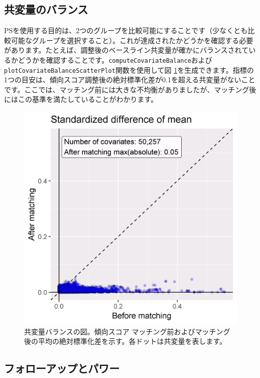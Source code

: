 \documentclass[
  11pt]{book}
\theoremstyle{definition}
\theoremstyle{definition}
\theoremstyle{definition}
\theoremstyle{definition}
\theoremstyle{remark}
\begin{document}
\subsection{共変量のバランス}\label{ux5171ux5909ux91cfux306eux30d0ux30e9ux30f3ux30b9}

PSを使用する目的は、2つのグループを比較可能にすることです（少なくとも比較可能なグループを選択すること）。これが達成されたかどうかを確認する必要があります。たとえば、調整後のベースライン共変量が確かにバランスされているかどうかを確認することです。\texttt{computeCovariateBalance}および\texttt{plotCovariateBalanceScatterPlot}関数を使用して図 \ref{fig:balance}を生成できます。指標の1つの目安は、傾向スコア調整後の絶対標準化差が0.1を超える共変量がないことです。ここでは、マッチング前には大きな不均衡がありましたが、マッチング後にはこの基準を満たしていることがわかります。 

\begin{figure}

{\centering \includegraphics[width=0.7\linewidth]{images/PopulationLevelEstimation/balance} 

}

\caption{共変量バランスの図。傾向スコア マッチング前およびマッチング後の平均の絶対標準化差を示す。各ドットは共変量を表します。}\label{fig:balance}
\end{figure}

\subsection{フォローアップとパワー}\label{ux30d5ux30a9ux30edux30fcux30a2ux30c3ux30d7ux3068ux30d1ux30efux30fc}
\end{document}
